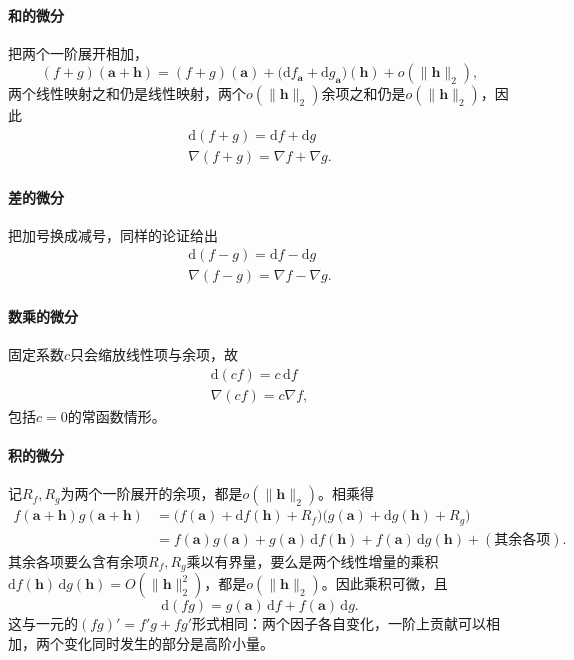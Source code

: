 \paragraph{和的微分}
把两个一阶展开相加，
\[
 (f+g)(\bm a+\bm h)=(f+g)(\bm a)+\bigl(\mathrm df_{\bm a}+\mathrm dg_{\bm a}\bigr)(\bm h)+o(\lVert\bm h\rVert_2),
\]
两个线性映射之和仍是线性映射，两个$o(\lVert\bm h\rVert_2)$余项之和仍是$o(\lVert\bm h\rVert_2)$，因此
\[
 \begin{gathered}
\mathrm d(f+g)=\mathrm df+\mathrm dg\\
\nabla(f+g)=\nabla f+\nabla g.
 \end{gathered}
\]

\paragraph{差的微分}
把加号换成减号，同样的论证给出
\[
 \begin{gathered}
\mathrm d(f-g)=\mathrm df-\mathrm dg\\
\nabla(f-g)=\nabla f-\nabla g.
 \end{gathered}
\]

\paragraph{数乘的微分}
固定系数$c$只会缩放线性项与余项，故
\[
 \begin{gathered}
\mathrm d(cf)=c\,\mathrm df\\
\nabla(cf)=c\nabla f,
 \end{gathered}
\]
包括$c=0$的常函数情形。

\paragraph{积的微分}
记$R_f,R_g$为两个一阶展开的余项，都是$o(\lVert\bm h\rVert_2)$。相乘得
\[
 \begin{aligned}
 f(\bm a+\bm h)g(\bm a+\bm h)
 &=\bigl(f(\bm a)+\mathrm df(\bm h)+R_f\bigr)\bigl(g(\bm a)+\mathrm dg(\bm h)+R_g\bigr)\\
 &=f(\bm a)g(\bm a)+g(\bm a)\,\mathrm df(\bm h)+f(\bm a)\,\mathrm dg(\bm h)+(\text{其余各项}).
 \end{aligned}
\]
其余各项要么含有余项$R_f,R_g$乘以有界量，要么是两个线性增量的乘积$\mathrm df(\bm h)\,\mathrm dg(\bm h)=O(\lVert\bm h\rVert_2^2)$，都是$o(\lVert\bm h\rVert_2)$。因此乘积可微，且
\[
 \mathrm d(fg)=g(\bm a)\,\mathrm df+f(\bm a)\,\mathrm dg.
\]
这与一元的$(fg)'=f'g+fg'$形式相同：两个因子各自变化，一阶上贡献可以相加，两个变化同时发生的部分是高阶小量。

